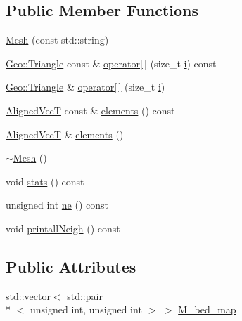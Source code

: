 \subsection*{Public Member Functions}
\begin{DoxyCompactItemize}
\item 
\hyperlink{classTspeed_1_1Mesh_a0f7593775e6a7b36d877551df395299f}{Mesh} (const std\-::string)
\item 
\hyperlink{classTspeed_1_1Geo_1_1Triangle}{Geo\-::\-Triangle} const \& \hyperlink{classTspeed_1_1Mesh_a20ac8fd5940e93ec902f343211100d78}{operator\mbox{[}$\,$\mbox{]}} (size\-\_\-t \hyperlink{vtk__vector__out_8m_a6f6ccfcf58b31cb6412107d9d5281426}{i}) const 
\item 
\hyperlink{classTspeed_1_1Geo_1_1Triangle}{Geo\-::\-Triangle} \& \hyperlink{classTspeed_1_1Mesh_af6688d1a47cee1baf69ea6d38d721a4a}{operator\mbox{[}$\,$\mbox{]}} (size\-\_\-t \hyperlink{vtk__vector__out_8m_a6f6ccfcf58b31cb6412107d9d5281426}{i})
\item 
\hyperlink{classTspeed_1_1Mesh_ae62a59eea301689dd9f7c9663414db18}{Aligned\-Vec\-T} const \& \hyperlink{classTspeed_1_1Mesh_ac889d7a89a2d98e84dbc9f0f1b2ebb45}{elements} () const 
\item 
\hyperlink{classTspeed_1_1Mesh_ae62a59eea301689dd9f7c9663414db18}{Aligned\-Vec\-T} \& \hyperlink{classTspeed_1_1Mesh_a0e9102ce786fc8c4cda93c4b012c8668}{elements} ()
\item 
\hyperlink{classTspeed_1_1Mesh_ae4422add9d3952fe2c02f62053ec120f}{$\sim$\-Mesh} ()
\item 
void \hyperlink{classTspeed_1_1Mesh_a10b24b91186b9905847232e7e14d4b2e}{stats} () const 
\item 
unsigned int \hyperlink{classTspeed_1_1Mesh_ac5b8a388b633ac0d280f89f56f2b15c5}{ne} () const 
\item 
void \hyperlink{classTspeed_1_1Mesh_a7ea0757951214e8dc3a68e9a60a1c17c}{printall\-Neigh} () const 
\end{DoxyCompactItemize}
\subsection*{Public Attributes}
\begin{DoxyCompactItemize}
\item 
std\-::vector$<$ std\-::pair\\*
$<$ unsigned int, unsigned int $>$ $>$ \hyperlink{classTspeed_1_1Mesh_a8cb823f02d7c75e48bf714b367b25b7d}{M\-\_\-bed\-\_\-map}
\end{DoxyCompactItemize}


